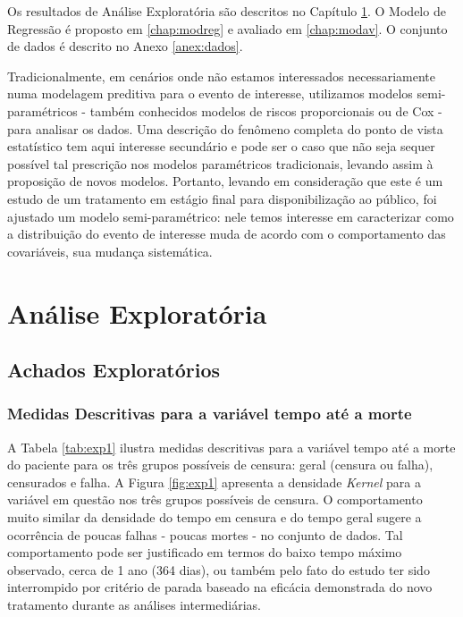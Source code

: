 \documentclass[
	12pt,				%
	openright,			%
	twoside,			%
	a4paper,			%
	english,			%
	brazil				%
	]{abntex2}
\begin{document}
Os resultados de Análise Exploratória são descritos no Capítulo \ref{chap:anexp}. O Modelo de Regressão é proposto em \ref{chap:modreg} e avaliado em \ref{chap:modav}. O conjunto de dados é descrito no Anexo \ref{anex:dados}.

Tradicionalmente, em cenários onde não estamos interessados necessariamente numa modelagem preditiva para o evento de interesse, utilizamos modelos semi-paramétricos - também conhecidos modelos de riscos proporcionais ou de Cox - para analisar os dados. Uma descrição do fenômeno completa do ponto de vista estatístico tem aqui interesse secundário e pode ser o caso que não seja sequer possível tal prescrição nos modelos paramétricos tradicionais, levando assim à proposição de novos modelos. Portanto, levando em consideração que este é um estudo de um tratamento em estágio final para disponibilização ao público, foi ajustado um modelo semi-paramétrico: nele temos interesse em caracterizar como a distribuição do evento de interesse muda de acordo com o comportamento das covariáveis, sua mudança sistemática. 

\part{Análise Exploratória}
\chapter{Achados Exploratórios}
\label{chap:anexp}


\section{Medidas Descritivas para a variável tempo até a morte}
A Tabela \ref{tab:exp1} ilustra medidas descritivas para a variável tempo até a morte do paciente para os três grupos possíveis de censura: geral (censura ou falha), censurados e falha. A Figura \ref{fig:exp1} apresenta a densidade \textit{Kernel} para a variável em questão nos três grupos possíveis de censura. O comportamento muito similar da densidade do tempo em censura e do tempo geral sugere a ocorrência de poucas falhas - poucas mortes - no conjunto de dados. Tal comportamento pode ser justificado em termos do baixo tempo máximo observado, cerca de 1 ano (364 dias), ou também pelo fato do estudo ter sido interrompido por critério de parada baseado na eficácia demonstrada do novo tratamento durante as análises intermediárias.
\end{document}
